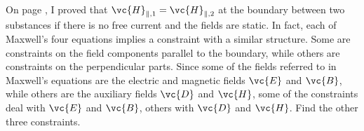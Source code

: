 On page \pageref{fig:permeability-boundary}, I proved that $\vc{H}_{\parallel,1}=\vc{H}_{\parallel,2}$
  at the boundary between two substances if there is no free current and the fields are static. In fact, each of Maxwell's
  four equations implies a constraint with a similar structure. Some are constraints on the field components parallel
  to the boundary, while others are constraints on the perpendicular parts. Since some of the fields referred to in Maxwell's
  equations are the electric and magnetic fields $\vc{E}$ and $\vc{B}$, while others are the auxiliary fields $\vc{D}$ and $\vc{H}$,
  some of the constraints deal with  $\vc{E}$ and $\vc{B}$, others with $\vc{D}$ and $\vc{H}$. Find the other three constraints.
